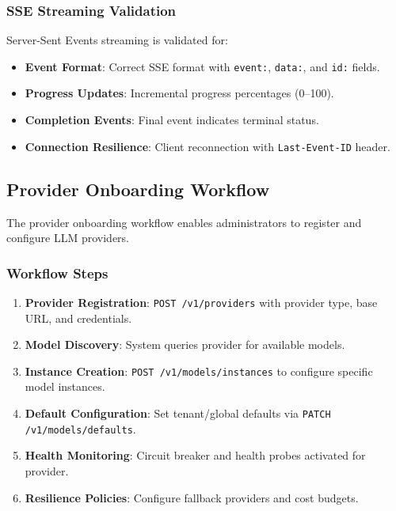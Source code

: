 \subsubsection{SSE Streaming Validation}

Server-Sent Events streaming is validated for:

\begin{itemize}
    \item \textbf{Event Format}: Correct SSE format with \texttt{event:}, \texttt{data:}, and \texttt{id:} fields.
    \item \textbf{Progress Updates}: Incremental progress percentages (0--100).
    \item \textbf{Completion Events}: Final event indicates terminal status.
    \item \textbf{Connection Resilience}: Client reconnection with \texttt{Last-Event-ID} header.
\end{itemize}

\subsection{Provider Onboarding Workflow}

The provider onboarding workflow enables administrators to register and configure LLM providers.

\subsubsection{Workflow Steps}

\begin{enumerate}
    \item \textbf{Provider Registration}: \texttt{POST /v1/providers} with provider type, base URL, and credentials.
    
    \item \textbf{Model Discovery}: System queries provider for available models.
    
    \item \textbf{Instance Creation}: \texttt{POST /v1/models/instances} to configure specific model instances.
    
    \item \textbf{Default Configuration}: Set tenant/global defaults via \texttt{PATCH /v1/models/defaults}.
    
    \item \textbf{Health Monitoring}: Circuit breaker and health probes activated for provider.
    
    \item \textbf{Resilience Policies}: Configure fallback providers and cost budgets.
\end{enumerate}

